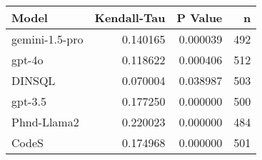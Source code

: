 \begin{tabular}{lrrr}
\toprule
Model & Kendall-Tau & P Value & n \\
\midrule
gemini-1.5-pro & 0.140165 & 0.000039 & 492 \\
gpt-4o & 0.118622 & 0.000406 & 512 \\
DINSQL & 0.070004 & 0.038987 & 503 \\
gpt-3.5 & 0.177250 & 0.000000 & 500 \\
Phnd-Llama2 & 0.220023 & 0.000000 & 484 \\
CodeS & 0.174968 & 0.000000 & 501 \\
\bottomrule
\end{tabular}
